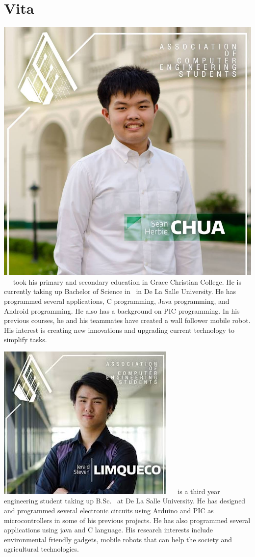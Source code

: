 \chapter{Vita}


\includegraphics[width=0.2\columnwidth]{author1}
 \  \ took his primary and secondary education in Grace Christian College. He is currently taking up Bachelor of Science in \degree \ in De La Salle University. He has programmed several applications, C programming, Java programming, and Android programming. He also has a background on PIC programming. In his previous courses, he and his teammates have created a wall follower mobile robot. His interest is creating new innovations and upgrading current technology to simplify tasks.


\includegraphics[width=0.2\columnwidth]{author2}
 \  \ is a third year engineering student taking up B.Sc. \degree \ at De La Salle University. He has designed and programmed several electronic circuits using Arduino and PIC as microcontrollers in some of his previous projects. He has also programmed several applications using java and C language. His research interests include environmental friendly gadgets, mobile robots that can help the society and agricultural technologies.

